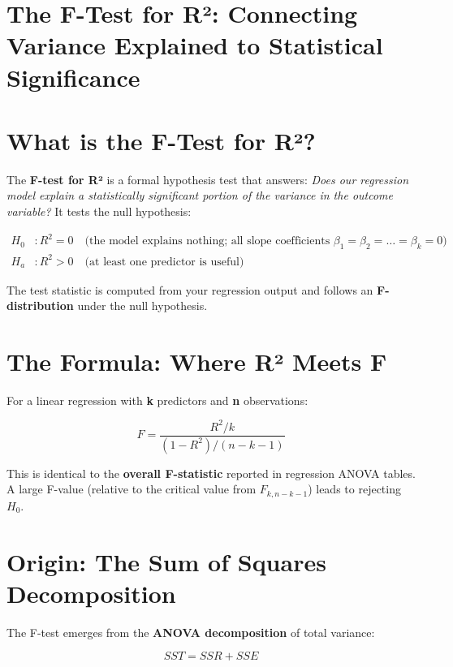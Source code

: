 \documentclass{article}
\begin{document}
\section*{The F-Test for R²: Connecting Variance Explained to Statistical Significance}

\section{What is the F-Test for R²?}

The \textbf{F-test for R²} is a formal hypothesis test that answers: \textit{Does our regression model explain a statistically significant portion of the variance in the outcome variable?} It tests the null hypothesis:

\begin{align*}
    H_0 &: R^2 = 0 \quad \text{(the model explains nothing; all slope coefficients } \beta_1 = \beta_2 = \dots = \beta_k = 0) \\
    H_a &: R^2 > 0 \quad \text{(at least one predictor is useful)}
\end{align*}

The test statistic is computed from your regression output and follows an \textbf{F-distribution} under the null hypothesis.

\section{The Formula: Where R² Meets F}

For a linear regression with \textbf{k} predictors and \textbf{n} observations:

\begin{equation}
    F = \frac{R^2/k}{(1 - R^2)/(n - k - 1)}
\end{equation}

This is identical to the \textbf{overall F-statistic} reported in regression ANOVA tables. A large F-value (relative to the critical value from $F_{k, n-k-1}$) leads to rejecting $H_0$.

\section{Origin: The Sum of Squares Decomposition}

The F-test emerges from the \textbf{ANOVA decomposition} of total variance:

\begin{equation}
    SST = SSR + SSE
\end{equation}
\end{document}
